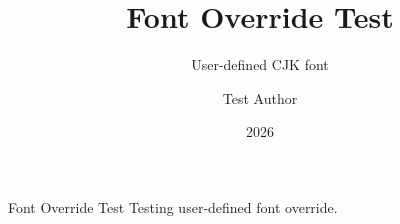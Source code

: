 \documentclass[aspectratio=169,10pt]{beamer}
\title{Font Override Test}
\subtitle{User-defined CJK font}
\author{Test Author}
\date{2026}
\begin{document}
\begin{frame}{Font Override Test}
  Testing user-defined font override.
\end{frame}
\end{document}
